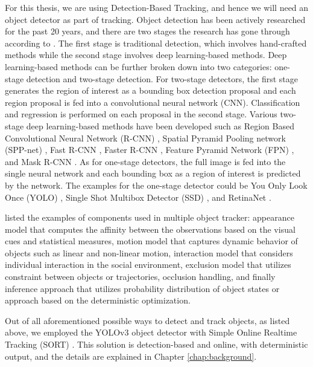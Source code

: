 For this thesis, we are using Detection-Based Tracking, and hence we will need an object detector as part of tracking. Object detection has been actively researched for the past 20 years, and there are two stages the research has gone through according to \citeauthor{zou_object_2019} \cite{zou_object_2019}. The first stage is traditional detection, which involves hand-crafted methods while the second stage involves deep learning-based methods. Deep learning-based methods can be further broken down into two categories: one-stage detection and two-stage detection. For two-stage detectors, the first stage generates the region of interest as a bounding box detection proposal and each region proposal is fed into a convolutional neural network (CNN). Classification and regression is performed on each proposal in the second stage. Various two-stage deep learning-based methods have been developed such as Region Based Convolutional Neural Network (R-CNN) \cite{girshick_rich_2014}, Spatial Pyramid Pooling network (SPP-net) \cite{he_spatial_2015}, Fast R-CNN \cite{girshick_fast_2015}, Faster R-CNN \cite{ren_faster_2017}, Feature Pyramid Network (FPN) \cite{lin_feature_2017}, and Mask R-CNN \cite{he_mask_2017}. As for one-stage detectors, the full image is fed into the single neural network and each bounding box as a region of interest is predicted by the network. The examples for the one-stage detector could be You Only Look Once (YOLO) \cite{redmon_you_2016}, Single Shot Multibox Detector (SSD) \cite{liu_ssd_2016}, and RetinaNet \cite{lin_focal_2017}.

\citeauthor{luo_multiple_2021} \cite{luo_multiple_2021} listed the examples of components used in multiple object tracker: appearance model that computes the affinity between the observations based on the visual cues and statistical measures, motion model that captures dynamic behavior of objects such as linear and non-linear motion, interaction model that considers individual interaction in the social environment, exclusion model that utilizes constraint between objects or trajectories, occlusion handling, and finally inference approach that utilizes probability distribution of object states or approach based on the deterministic optimization.

Out of all aforementioned possible ways to detect and track objects, as listed above, we employed the YOLOv3 object detector \cite{redmon_yolov3_2018} with Simple Online Realtime Tracking (SORT) \cite{bewley_simple_2016}. This solution is detection-based and online, with deterministic output, and the details are explained in Chapter \ref{chap:background}.
